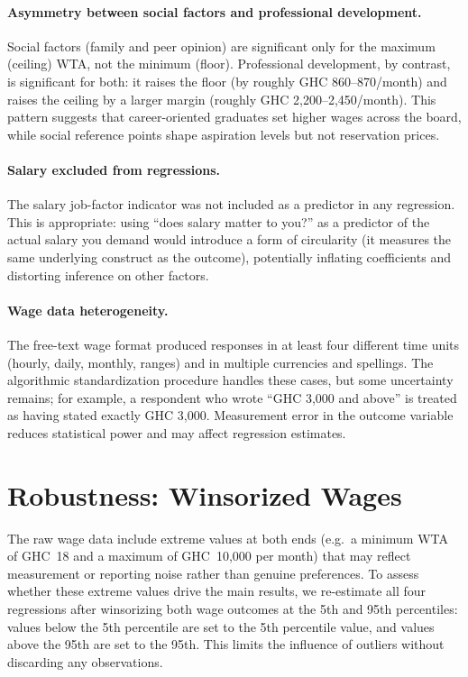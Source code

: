 \documentclass[12pt]{article}
\begin{document}
\paragraph{Asymmetry between social factors and professional development.}
Social factors (family and peer opinion) are significant only for the maximum
(ceiling) WTA, not the minimum (floor). Professional development, by contrast,
is significant for both: it raises the floor (by roughly GHC 860--870/month)
and raises the ceiling by a larger margin (roughly GHC 2,200--2,450/month).
This pattern suggests that career-oriented graduates set higher wages across the
board, while social reference points shape aspiration levels but not reservation
prices.

\paragraph{Salary excluded from regressions.}\label{sec:notes}
The salary job-factor indicator was not included as a predictor in any regression. This is appropriate: using ``does salary matter
to you?'' as a predictor of the actual salary you demand would introduce a form of
circularity (it measures the same underlying construct as the outcome), potentially
inflating coefficients and distorting inference on other factors.

\paragraph{Wage data heterogeneity.}
The free-text wage format produced responses in at least four different time units
(hourly, daily, monthly, ranges) and in multiple currencies and spellings. The
algorithmic standardization procedure handles these cases, but some uncertainty
remains; for example, a respondent who wrote ``GHC 3,000 and above'' is treated
as having stated exactly GHC 3,000. Measurement error in the outcome variable
reduces statistical power and may affect regression estimates.

\section{Robustness: Winsorized Wages}

The raw wage data include extreme values at both ends (e.g.\ a minimum WTA of GHC~18
and a maximum of GHC~10,000 per month) that may reflect measurement or reporting
noise rather than genuine preferences. To assess whether these
extreme values drive the main results, we re-estimate all four regressions
after winsorizing both wage outcomes at the 5th and 95th percentiles: values
below the 5th percentile are set to the 5th percentile value, and values above
the 95th are set to the 95th. This limits the influence of outliers without
discarding any observations.
\end{document}
